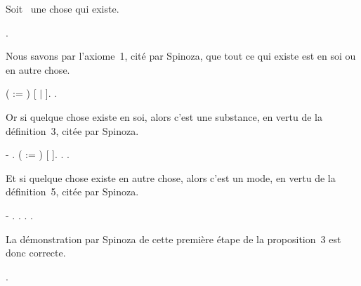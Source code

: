 \documentclass[12pt]{report}
\begin{document}
Soit  une chose qui existe. \begin{coqdoccode}
\coqdocemptyline
\coqdocindent{2.00em}
  .\coqdoceol
\coqdocemptyline
\end{coqdoccode}
Nous savons par l'axiome 1, cité par Spinoza, que tout ce qui
    existe est en soi ou en autre chose. \begin{coqdoccode}
\coqdocemptyline
\coqdocindent{2.00em}
   ( := ) \coqdoceol
\coqdocindent{3.00em}
 [ \ensuremath{|} ].\coqdoceol
\coqdocindent{2.00em}
 .\coqdoceol
\coqdocemptyline
\end{coqdoccode}
Or si quelque chose existe en soi, alors c'est une substance, en
    vertu de la définition 3, citée par Spinoza. \begin{coqdoccode}
\coqdocemptyline
\coqdocindent{2.00em}
- .\coqdoceol
\coqdocindent{3.00em}
   ( := ) \coqdoceol
\coqdocindent{4.00em}
 [ ].\coqdoceol
\coqdocindent{3.00em}
 .  .\coqdoceol
\coqdocemptyline
\end{coqdoccode}
Et si quelque chose existe en autre chose, alors c'est un mode,
    en vertu de la définition 5, citée par Spinoza. \begin{coqdoccode}
\coqdocemptyline
\coqdocindent{2.00em}
- .\coqdoceol
\coqdocindent{3.00em}
 .  .  .\coqdoceol
\coqdocemptyline
\end{coqdoccode}
La démonstration par Spinoza de cette première étape de la
  proposition 3 est donc correcte. \begin{coqdoccode}
\coqdocemptyline
\coqdocindent{1.00em}
.\coqdoceol
\coqdocemptyline
\end{coqdoccode}
\end{document}
